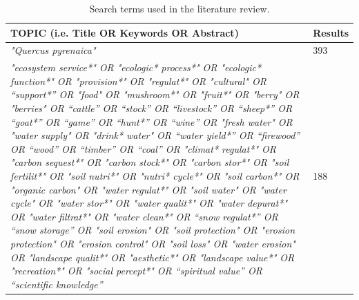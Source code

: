 \begin{table}[]
\caption{Search terms used in the literature review.}
\label{tab:es:wos}
\footnotesize
\begin{tabular}{>{\centering}p{11cm}l}
\toprule
\textbf{TOPIC (i.e. Title OR Keywords OR Abstract)} & \textbf{Results} \\ 
\toprule
\emph{"Quercus pyrenaica"} & 393 \\ \midrule
\emph{"ecosystem service*" OR "ecologic* process*" OR "ecologic*
function*" OR "provision*" OR "regulat*" OR "cultural" OR ``support*'' OR
"food" OR "mushroom*" OR "fruit*" OR "berry" OR "berries" OR
``cattle'' OR ``stock'' OR ``livestock'' OR ``sheep*'' OR ``goat*'' OR
``game'' OR ``hunt*'' OR ``wine'' OR "fresh water" OR "water supply" OR "drink* water" OR ``water
yield*'' OR ``firewood'' OR ``wood'' OR ``timber'' OR ``coal'' OR "climat* regulat*" OR "carbon sequest*" OR "carbon stock*" OR "carbon stor*" OR "soil fertilit*" OR "soil nutri*" OR "nutri* cycle*" OR "soil
carbon*" OR "organic carbon" OR "water regulat*" OR "soil water" OR "water cycle" OR "water stor*"
OR "water qualit*" OR "water depurat*" OR "water filtrat*" OR "water
clean*" OR ``snow regulat*'' OR ``snow storage'' OR "soil erosion" OR "soil protection" OR "erosion protection" OR
"erosion control" OR "soil loss" OR "water erosion" OR "landscape qualit*" OR "aesthetic*" OR "landscape value*" OR
"recreation*" OR "social percept*" OR ``spiritual value'' OR
``scientific knowledge''} & 188 \\
\bottomrule
\end{tabular}
\end{table}

